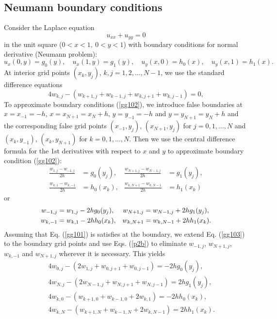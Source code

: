 \subsection{Neumann boundary conditions} 
Consider the Laplace equation
\begin{equation}
u_{xx}+u_{yy} =0    \label{gg101}
\end{equation}
in the unit square ($0<x<1, \ 0<y<1$) with boundary conditions for normal derivative
(Neumann problem):
\begin{equation}
u_{x}(0,y) =g_{0}(y), \quad u_{x}(1,y) =g_{1}(y), \quad u_{y}(x,0)=h_{0}(x), \quad
u_{y}(x,1) = h_{1}(x).    \label{gg102}
\end{equation}
At interior grid points $(x_{k},y_{j})$, $k,j=1,2,\dots,N-1$, we use the standard difference equations
\begin{equation}
4w_{k,j}-\left(w_{k+1,j}+w_{k-1,j}+w_{k,j+1}+w_{k,j-1}\right)
=0, \label{gg103}
\end{equation}
To approximate boundary conditions (\ref{gg102}),
we introduce false boundaries at $x=x_{-1}=-h$, $x=x_{N+1}=x_{N}+h$, $y=y_{-1}=-h$ and $y=y_{N+1}=y_{N}+h$
and the corresponding false grid points
$(x_{-1},y_{j})$, $(x_{N+1},y_{j})$ for $j=0,1,\dots,N$
and $(x_{k},y_{-1})$, $(x_{k},y_{N+1})$ for $k=0,1,\dots,N$.
Then we use the central difference formula for the 1st derivatives
with respect to $x$ and $y$ to approximate boundary condition (\ref{gg102}):
\begin{align*}
\frac{w_{1,j}-w_{-1,j}}{2h}&=g_{0}(y_j),  & \frac{w_{N+1,j}-w_{N-1,j}}{2h}&=g_{1}(y_j), \\
\frac{w_{k,1}-w_{k,-1}}{2h}&=h_{0}(x_k),  & \frac{w_{k,N+1}-w_{k,N-1}}{2h}&=h_{1}(x_k)
\end{align*}
or
\begin{align}
w_{-1,j}&=w_{1,j}-2h g_{0}(y_j), & w_{N+1,j}&=w_{N-1,j}+2h g_{1}(y_j), \notag\\
w_{k,-1}&=w_{k,1}-2h h_{0}(x_k), & w_{k,N+1}&=w_{k,N-1}+2h h_{1}(x_k). \label{p2b}
\end{align}
Assuming that Eq. (\ref{gg101}) is satisfies at the boundary, we extend Eq.  (\ref{gg103})
to the boundary grid points and use Eqs. (\ref{p2b})
to eliminate $w_{-1,j}$, $w_{N+1,j}$, $w_{k,-1}$ and $w_{N+1,j}$ wherever it is necessary. This yields
\begin{eqnarray}
&&4w_{0,j}-\left(2w_{1,j}+w_{0,j+1}+w_{0,j-1}\right)
=-2h g_{0}(y_j), \label{gg104} \\
&&4w_{N,j}-\left(2w_{N-1,j}+w_{N,j+1}+w_{N,j-1}\right)
=2h g_{1}(y_j), \label{gg105} \\
&&4w_{k,0}-\left(w_{k+1,0}+w_{k-1,0}+2w_{k,1}\right)
=-2h h_{0}(x_k), \label{gg106} \\
&&4w_{k,N}-\left(w_{k+1,N}+w_{k-1,N}+2w_{k,N-1}\right)
=2h h_{1}(x_k). \label{gg107}
\end{eqnarray}
